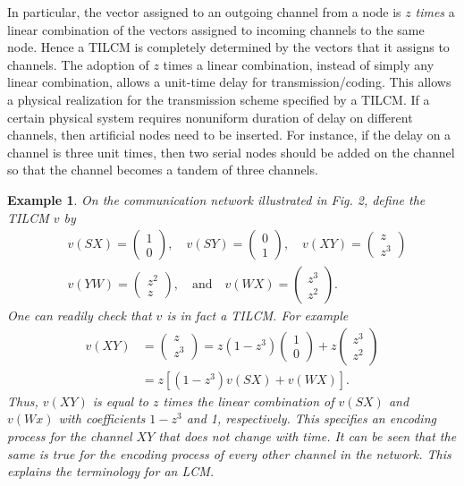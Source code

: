 \documentclass[journal]{IEEEtran}
\newtheorem{exam}[prop]{Example}
\begin{document}
\par
In particular, the vector assigned to an outgoing channel from a node is $z$ \emph{times} a linear combination of the vectors assigned to incoming channels to the same node. Hence a TILCM is completely determined by the vectors that it assigns to channels. The adoption of $z$ times a linear combination, instead of simply any linear combination, allows a unit-time delay for transmission/coding. This allows a physical realization for the transmission scheme specified by a TILCM. If a certain physical system requires nonuniform duration of delay on different channels, then artificial nodes need to be inserted. For instance, if the delay on a channel is three unit times, then two serial nodes should be added on the channel so that the channel becomes a tandem of three channels.
\begin{exam}
	On the communication network illustrated in Fig. 2, define the TILCM $v$ by
	\begin{align*}
	&v(SX)=\begin{pmatrix} 1 \\ 0 \end{pmatrix},\quad v(SY)=\begin{pmatrix} 0 \\ 1 \end{pmatrix}, \quad v(XY)=\begin{pmatrix} z \\ z^3 \end{pmatrix}\\
	&v(YW)=\begin{pmatrix} z^2 \\ z \end{pmatrix}, \quad \text{and}\quad v(WX)=\begin{pmatrix} z^3 \\ z^2 \end{pmatrix}.
	\end{align*}
	One can readily check that $v$ is in fact a TILCM. For example
	\begin{align*}
	v(XY) & = \begin{pmatrix} z \\ z^3 \end{pmatrix}=z(1-z^3)\begin{pmatrix} 1 \\ 0 \end{pmatrix}+z\begin{pmatrix} z^3 \\ z^2 \end{pmatrix}\\
	& = z[(1-z^3)v(SX)+v(WX)].
	\end{align*}
	Thus, $v(XY)$ is equal to $z$ times the linear combination of $v(SX)$ and $v(Wx)$ with coefficients $1-z^3$ and 1, respectively. This specifies an encoding process for the channel $XY$ that does not change with time. It can be seen that the same is true for the encoding process of every other channel in the network. This explains the terminology  for an LCM.
\end{exam}
\end{document}
